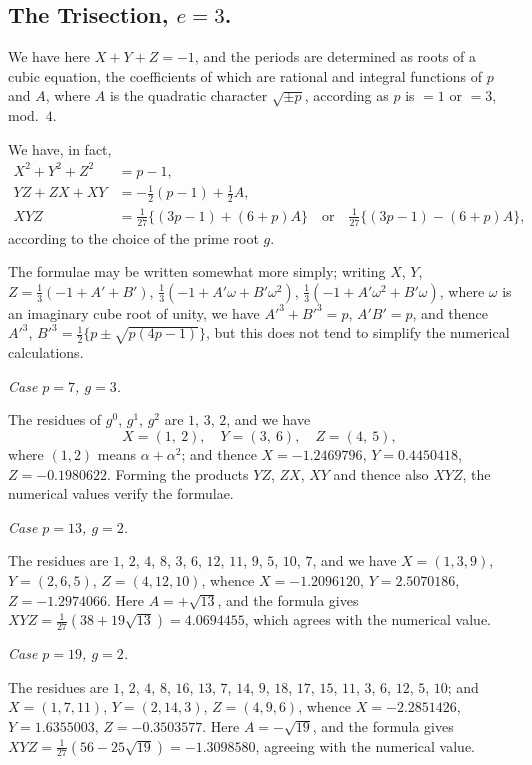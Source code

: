 \documentclass[11pt,a4paper]{book}
\begin{document}
\subsection*{The Trisection, $e=3$.}

We have here $X+Y+Z=-1$, and the periods are determined as
roots of a cubic equation, the coefficients of which are rational and
integral functions of $p$ and $A$, where $A$ is the quadratic character
$\sqrt{\pm p}$, according as $p$ is $=1$ or $=3$, mod.~$4$.

We have, in fact,
\begin{align*}
X^2 + Y^2 + Z^2 &= p-1,\\
YZ + ZX + XY &= -\tfrac{1}{2}(p-1) + \tfrac{1}{2}A,\\
XYZ &= \tfrac{1}{27}\{(3p-1) + (6+p)A\} \quad\text{or}\quad
      \tfrac{1}{27}\{(3p-1) - (6+p)A\},
\end{align*}
according to the choice of the prime root $g$.

The formulae may be written somewhat more simply; writing
$X$, $Y$, $Z = \frac{1}{3}(-1+A'+B')$, $\frac{1}{3}(-1+A'\omega+B'\omega^2)$,
$\frac{1}{3}(-1+A'\omega^2+B'\omega)$, where $\omega$ is an imaginary cube root of
unity, we have $A'^3+B'^3=p$, $A'B'=p$, and thence
$A'^3$, $B'^3 = \frac{1}{2}\{p \pm \sqrt{p(4p-1)}\}$, but this does not tend to
simplify the numerical calculations.

\textit{Case $p=7$, $g=3$.}

The residues of $g^0$, $g^1$, $g^2$ are $1$, $3$, $2$, and we have
\[
X = (1,\ 2),\quad Y = (3,\ 6),\quad Z = (4,\ 5),
\]
where $(1,2)$ means $\alpha+\alpha^2$; and thence $X=-1.2469796$,
$Y=0.4450418$, $Z=-0.1980622$. Forming the products $YZ$, $ZX$, $XY$
and thence also $XYZ$, the numerical values verify the formulae.

\textit{Case $p=13$, $g=2$.}

The residues are $1$, $2$, $4$, $8$, $3$, $6$, $12$, $11$, $9$, $5$, $10$, $7$,
and we have $X=(1,3,9)$, $Y=(2,6,5)$, $Z=(4,12,10)$, whence
$X=-1.2096120$, $Y=2.5070186$, $Z=-1.2974066$. Here $A=+\sqrt{13}$,
and the formula gives $XYZ=\frac{1}{27}(38+19\sqrt{13})=4.0694455$,
which agrees with the numerical value.

\textit{Case $p=19$, $g=2$.}

The residues are $1$, $2$, $4$, $8$, $16$, $13$, $7$, $14$, $9$, $18$, $17$,
$15$, $11$, $3$, $6$, $12$, $5$, $10$; and $X=(1,7,11)$, $Y=(2,14,3)$,
$Z=(4,9,6)$, whence $X=-2.2851426$, $Y=1.6355003$,
$Z=-0.3503577$. Here $A=-\sqrt{19}$, and the formula gives
$XYZ=\frac{1}{27}(56-25\sqrt{19})=-1.3098580$, agreeing with the numerical
value.
\end{document}

